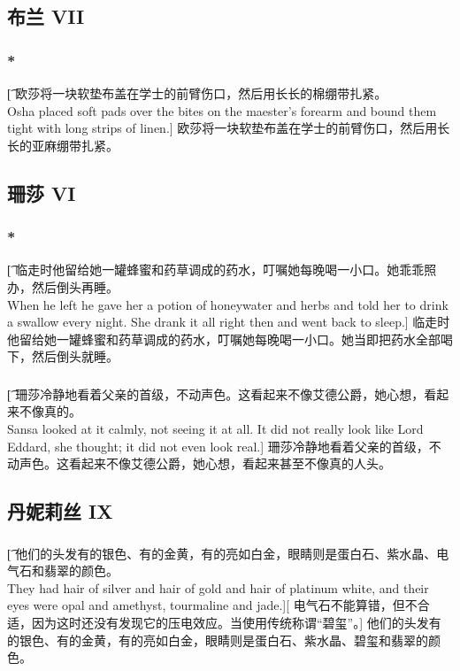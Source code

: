 \documentclass[12pt,a4paper]{article}
\begin{document}
\subsection{布兰 VII}
\subsubsection{\color{red}*}\t[
	欧莎将一块软垫布盖在学士的前臂伤口，然后用长长的棉绷带扎紧。\\
	Osha placed soft pads over the bites on the maester's forearm and bound them tight with long strips of linen.]
	欧莎将一块软垫布盖在学士的前臂伤口，然后用长长的亚麻绷带扎紧。
	
\subsection{珊莎 VI}
\subsubsection{\color{red}*}\t[
	临走时他留给她一罐蜂蜜和药草调成的药水，叮嘱她每晚喝一小口。她乖乖照办，然后倒头再睡。\\
	When he left he gave her a potion of honeywater and herbs and told her to drink a swallow every night. She drank it all right then and went back to sleep.]
	临走时他留给她一罐蜂蜜和药草调成的药水，叮嘱她每晚喝一小口。她当即把药水全部喝下，然后倒头就睡。
\subsubsection{}\t[
	珊莎冷静地看着父亲的首级，不动声色。这看起来不像艾德公爵，她心想，看起来不像真的。\\
	Sansa looked at it calmly, not seeing it at all. It did not really look like Lord Eddard, she thought; it did not even look real.]
	珊莎冷静地看着父亲的首级，不动声色。这看起来不像艾德公爵，她心想，看起来甚至不像真的人头。
		
\subsection{丹妮莉丝 IX}
\subsubsection{}\t[
	他们的头发有的银色、有的金黄，有的亮如白金，眼睛则是蛋白石、紫水晶、电气石和翡翠的颜色。\\
	They had hair of silver and hair of gold and hair of platinum white, and their eyes were opal and amethyst, tourmaline and jade.][
	电气石不能算错，但不合适，因为这时还没有发现它的压电效应。当使用传统称谓“碧玺”。]
	他们的头发有的银色、有的金黄，有的亮如白金，眼睛则是蛋白石、紫水晶、碧玺和翡翠的颜色。
	
\end{document}
